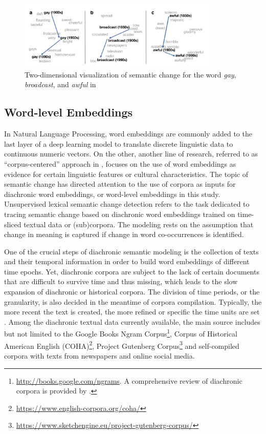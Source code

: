 \begin{figure}[H]
  \centering
  \includegraphics[width=0.85\textwidth,keepaspectratio]{figures_ref/Hamilton_et_al_2016_two_dimension_viz_of_semantic_change.png}
  \caption{Two-dimensional visualization of semantic change for the word \textit{gay}, \textit{broadcast}, and \textit{awful} in \textcite{hamilton2016law}} \label{fig:hamilton}
\end{figure}

\subsection{Word-level Embeddings}
In Natural Language Processing, word embeddings are commonly added to the last layer of a deep learning model to translate discrete linguistic data to continuous numeric vectors. On the other, another line of research, referred to as ``corpus-centered'' approach in \textcite{antoniak2018evaluating}, focuses on the use of word embeddings as evidence for certain linguistic features or cultural characteristics. The topic of semantic change has directed attention to the use of corpora as inputs for diachronic word embeddings, or word-level embeddings in this study. Unsupervised lexical semantic change detection refers to the task dedicated to tracing semantic change based on diachronic word embeddings trained on time-sliced textual data or (sub)corpora. The modeling rests on the assumption that change in meaning is captured if change in word co-occurrences is identified.

One of the crucial steps of diachronic semantic modeling is the collection of texts and their temporal information in order to build word embeddings of different time epochs. Yet, diachronic corpora are subject to the lack of certain documents that are difficult to survive time and thus missing, which leads to the slow expansion of diachronic or historical corpora. The division of time periods, or the granularity, is also decided in the meantime of corpora compilation. Typically, the more recent the text is created, the more refined or specific the time units are set \parencite{kutuzov2018survey}. Among the diachronic textual data currently available, the main source includes but not limited to the Google Books Ngram Corpus\footnote{\url{http://books.google.com/ngrams}. A comprehensive review of diachronic corpora is provided by \textcite[38--41]{tahmasebi2018survey}.}, Corpus of Historical American English (COHA)\footnote{\url{https://www.english-corpora.org/coha/}}, Project Gutenberg Corpus\footnote{\url{https://www.sketchengine.eu/project-gutenberg-corpus/}} and self-compiled corpora with texts from newspapers and online social media.

